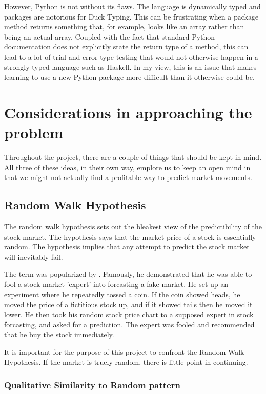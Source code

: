 \documentclass{report}
\begin{document}
However, Python is not without its flaws. The language is dynamically typed and packages are notorious for Duck Typing. This can be frustrating when a package method returns something that, for example, looks like an array rather than being an actual array. Coupled with the fact that standard Python documentation does not explicitly state the return type of a method, this can lead to a lot of trial and error type testing that would not otherwise happen in a strongly typed language such as Haskell. In my view, this is an issue that makes learning to use a new Python package more difficult than it otherwise could be.

\chapter{Considerations in approaching the problem}

Throughout the project, there are a couple of things that should be kept in mind. All three of these ideas, in their own way, emplore us to keep an open mind in that we might not actually find a profitable way to predict market movements.

\section{Random Walk Hypothesis}

The random walk hypothesis sets out the bleakest view of the predictibility of the stock market. The hypothesis says that the market price of a stock is essentially random. The hypothesis implies that any attempt to predict the stock market will inevitably fail. 

The term was popularized by \citet{malkiel1999random}. Famously, he demonstrated that he was able to fool a stock market 'expert' into forcasting a fake market. He set up an experiment where he repeatedly tossed a coin. If the coin showed heads, he moved the price of a fictitious stock up, and if it showed tails then he moved it lower. He then took his random stock price chart to a supposed expert in stock forcasting, and asked for a prediction. The expert was fooled and recommended that he buy the stock immediately. 

It is important for the purpose of this project to confront the Random Walk Hypothesis. If the market is truely random, there is little point in continuing. 

\subsection{Qualitative Similarity to Random pattern}
\end{document}
